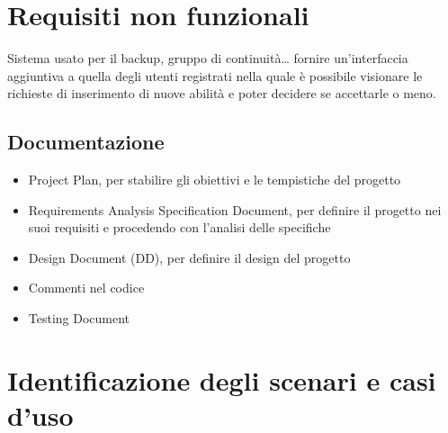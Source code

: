 \documentclass[a4paper,12pt]{article}
\begin{document}
\section{Requisiti non funzionali}
Sistema usato per il backup, gruppo di continuità…
fornire un’interfaccia aggiuntiva a quella degli utenti registrati nella quale è possibile visionare le richieste di inserimento di nuove abilità e poter decidere se accettarle o meno.
\subsection{Documentazione}
\begin{itemize}
\item Project Plan, per stabilire gli obiettivi e le tempistiche del progetto
\item Requirements Analysis Specification Document, per definire il progetto nei suoi requisiti e procedendo con l’analisi delle specifiche
\item Design Document (DD), per definire il design del progetto
\item Commenti nel codice
\item Testing Document
\end{itemize}

\clearpage

\section{Identificazione degli scenari e casi d'uso}
\end{document}
